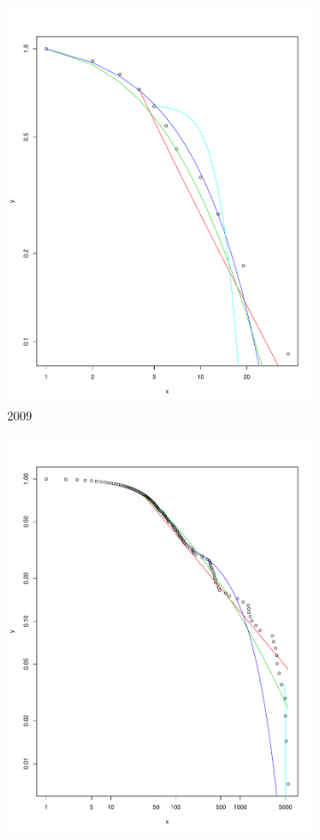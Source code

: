 \documentclass[preprint,12pt]{elsarticle}
\begin{document}
\begin{figure}[H]
\centering
\begin{subfigure}{.3\textwidth}
  \centering
  \includegraphics[width=.8\linewidth]{Bitcoin-graphs/degree-dist-in-2009.pdf}  
  \caption{2009}
  \label{fig:2009in}
\end{subfigure}
\begin{subfigure}{.3\textwidth}
  \centering
  \includegraphics[width=.8\linewidth]{Bitcoin-graphs/deg-dist-2010-in.pdf}  

\end{subfigure}
\end{figure}
\end{document}
